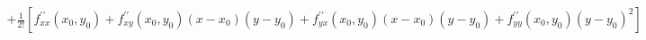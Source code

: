 \documentclass[preview]{standalone}
\begin{document}
\begin{align*}
+ \frac{1}{2 !}[ f_{x x}^{\prime \prime}(x_0, y_0) +f_{x y}^{\prime \prime}(x_0, y_0)(x-x_0)(y-y_0) +f_{y x}^{\prime \prime}(x_0, y_0)(x-x_0)(y-y_0) +f_{y y}^{\prime \prime}(x_0, y_0)(y-y_0)^2]
\end{align*}
\end{document}
